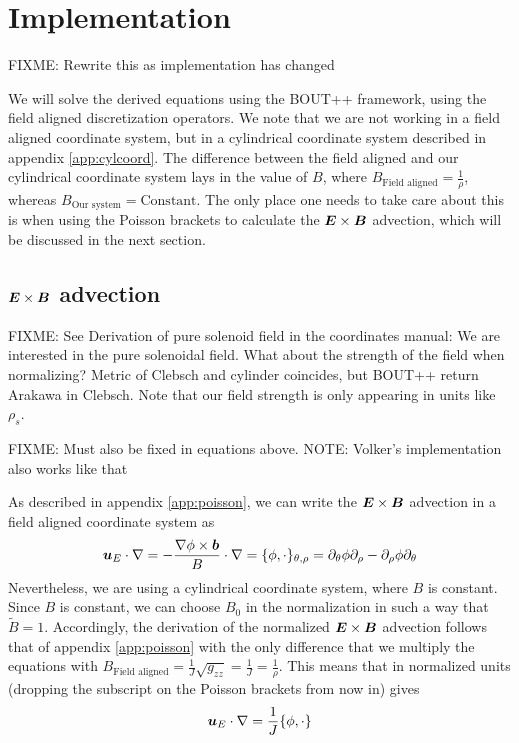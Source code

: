 \section{Implementation}
\label{sec:implementation}
FIXME: Rewrite this as implementation has changed

%
We will solve the derived equations using the BOUT++ framework, using the field
aligned discretization operators. We note that we are not working in a field
aligned coordinate system, but in a cylindrical coordinate system described in
appendix \ref{app:cylcoord}. The difference between the field aligned and our
cylindrical coordinate system lays in the value of $B$, where $B_\text{Field
    aligned}=\frac{1}{\rho}$, whereas $B_\text{Our system}=\text{Constant}$.
The only place one needs to take care about this is when using the Poisson
brackets to calculate the $\boldsymbol{E}\times \boldsymbol{B}$ advection, which will be
discussed in the next section.

\subsection{\texorpdfstring{$\boldsymbol{E}\times \boldsymbol{B}$}{ExB} advection}
\label{sec:ExBadv}
FIXME: See Derivation of pure solenoid field in the coordinates manual: We are
interested in the pure solenoidal field. What about the strength of the field
when normalizing? Metric of Clebsch and cylinder coincides, but BOUT++ return
Arakawa in Clebsch. Note that our field strength is only appearing in units
like $\rho_s$.

FIXME: Must also be fixed in equations above. NOTE: Volker's implementation
also works like that

As described in appendix \ref{app:poisson}, we can write the
$\boldsymbol{E}\times\boldsymbol{B}$ advection in a field aligned coordinate system as
%
\begin{align}
    \boldsymbol{u}_E\cdot\nabla
    = -\frac{\nabla\phi\times\boldsymbol{b}}{B}\cdot\nabla
    = \{\phi, \cdot\}_{\theta,\rho}
    = \partial_\theta\phi\partial_\rho - \partial_\rho\phi\partial_\theta
    \label{eq:non_norm_adv}
\end{align}
%
Nevertheless, we are using a cylindrical coordinate system, where $B$ is
constant.  Since $B$ is constant,
we can choose $B_0$ in the normalization in such a way that $\widetilde{B}=1$.
Accordingly, the derivation of the normalized $\boldsymbol{E}\times \boldsymbol{B}$ advection
follows that of appendix \ref{app:poisson} with the only difference that we
multiply the equations with
$B_\text{Field aligned}=\frac{1}{J}\sqrt{g_{zz}}=\frac{1}{J}=\frac{1}{\rho}$.
This means that in normalized units (dropping the subscript on the Poisson
brackets from now in) gives
%
\begin{align*}
    \boldsymbol{u}_E\cdot\nabla = \frac{1}{J}\{\phi, \cdot\}
\end{align*}


